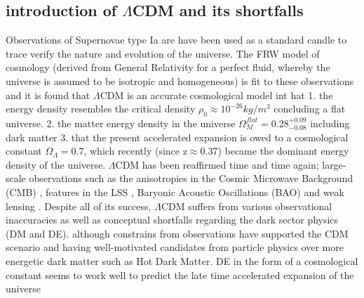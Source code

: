 \documentclass[a4paper,fleqn,usenatbib]{mnras}
\def \lcdm{$\Lambda$CDM }
\begin{document}
\subsection{introduction of $\Lambda$CDM and its shortfalls}
Observations of Supernovae type Ia are have been used as a standard candle to trace verify the nature and evolution of the universe. The FRW model of cosmology (derived from General Relativity for a perfect fluid, whereby the universe is assumed to be isotropic and homogeneous) is fit to these observations and it is found that \lcdm is an accurate cosmological model int hat 1. the energy density resembles the critical density $\rho_{0}\approx 10^{-26}kg/m^{3}$ concluding a flat universe. 2. the matter energy density in the universe $\Omega_{M}^{flat}=0.28^{+0.09}_{-0.08}$ including dark matter 3. that the present accelerated expansion is owed to a cosmological constant $\Omega_{\Lambda}=0.7$, which recently (since z$\approx$0.37) became the dominant energy density of the universe. \citep{Riess_98,Perlmutter_99}
\lcdm has been reaffirmed time and time again; large-scale observations such as the anisotropies in the Cosmic Microwave Background (CMB) \citep{Bennett_13,Plank_14b,Plank_16}, features in the LSS \citep{Abazajian_09}, Baryonic Acoustic Oscillations (BAO) \citep{Beutler_11} and weak lensing \citep{Kilbinger_13}.
Despite all of its success, \lcdm suffers from various observational inaccuracies as well as conceptual shortfalls regarding the dark sector physics (DM and DE). although constrains from observations have supported the CDM scenario \citep{Bertone_05,Petraki_13} and having well-motivated candidates from particle physics over more energetic dark matter such as Hot Dark Matter. DE in the form of a cosmological constant seems to work well to predict the late time accelerated expansion of the universe \citep{Suzuki_12}
\end{document}
